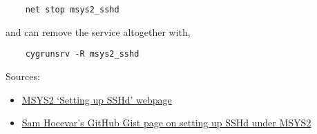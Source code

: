 \begin{itemize}
	\begin{lstlisting}
	net stop msys2_sshd
	\end{lstlisting}

	and can remove the service altogether with, 

	\begin{lstlisting}
	cygrunsrv -R msys2_sshd
	\end{lstlisting}
\end{itemize}
Sources:
\begin{itemize}
	\item \href{https://www.msys2.org/wiki/Setting-up-SSHd}{MSYS2 `Setting up SSHd' webpage}
	\item \href{https://gist.github.com/samhocevar/00eec26d9e9988d080ac}{Sam Hocevar's GitHub Gist page on setting up SSHd under MSYS2}
\end{itemize}

\clearpage %
